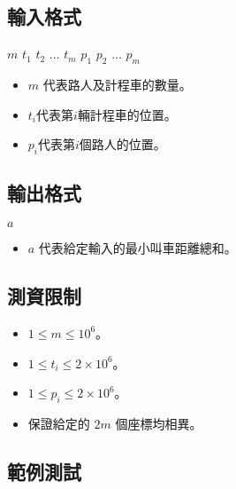\subsection{輸入格式}

\begin{format}
\f{
$m$
$t_1$ $t_2$ $\ldots$ $t_m$
$p_1$ $p_2$ $\ldots$ $p_m$
}
\end{format}

\begin{itemize}
\tightlist
\item
  \(m\) 代表路人及計程車的數量。
\item
  \(t_i\)代表第\(i\)輛計程車的位置。
\item
  \(p_i\)代表第\(i\)個路人的位置。
\end{itemize}

\subsection{輸出格式}

\begin{format}
\f{
$a$
}
\end{format}

\begin{itemize}
\tightlist
\item
  \(a\) 代表給定輸入的最小叫車距離總和。
\end{itemize}

\subsection{測資限制}

\begin{itemize}
\tightlist
\item
  \(1 \leq m \leq 10^6\)。
\item
  \(1 \leq t_i \leq 2 \times 10^6\)。
\item
  \(1 \leq p_i \leq 2 \times 10^6\)。
\item
  保證給定的 \(2m\) 個座標均相異。
\end{itemize}

\subsection{範例測試}

\begin{example}
%
%
\end{example}

